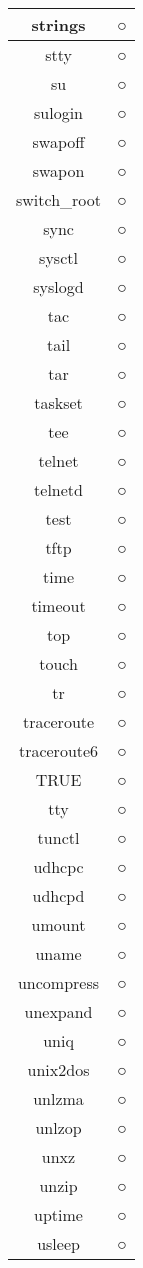 \begin{longtable}{cc}
strings & ○ \\ \hline
stty & ○ \\ \hline
su & ○ \\ \hline
sulogin & ○ \\ \hline
swapoff & ○ \\ \hline
swapon & ○ \\ \hline
switch\_root & ○ \\ \hline
sync & ○ \\ \hline
sysctl & ○ \\ \hline
syslogd & ○ \\ \hline
tac & ○ \\ \hline
tail & ○ \\ \hline
tar & ○ \\ \hline
taskset & ○ \\ \hline
tee & ○ \\ \hline
telnet & ○ \\ \hline
telnetd & ○ \\ \hline
test & ○ \\ \hline
tftp & ○ \\ \hline
time & ○ \\ \hline
timeout & ○ \\ \hline
top & ○ \\ \hline
touch & ○ \\ \hline
tr & ○ \\ \hline
traceroute & ○ \\ \hline
traceroute6 & ○ \\ \hline
TRUE & ○ \\ \hline
tty & ○ \\ \hline
tunctl & ○ \\ \hline
udhcpc & ○ \\ \hline
udhcpd & ○ \\ \hline
umount & ○ \\ \hline
uname & ○ \\ \hline
uncompress & ○ \\ \hline
unexpand & ○ \\ \hline
uniq & ○ \\ \hline
unix2dos & ○ \\ \hline
unlzma & ○ \\ \hline
unlzop & ○ \\ \hline
unxz & ○ \\ \hline
unzip & ○ \\ \hline
uptime & ○ \\ \hline
usleep & ○ \\ \hline

\end{longtable}
